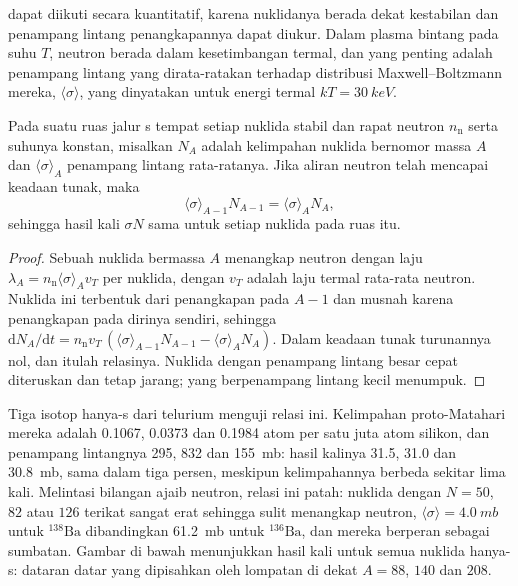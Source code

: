  dapat diikuti secara kuantitatif, karena nuklidanya berada dekat kestabilan dan
penampang lintang penangkapannya dapat diukur. Dalam plasma bintang pada suhu $T$,
neutron berada dalam kesetimbangan termal, dan yang penting adalah
penampang lintang yang dirata-ratakan terhadap distribusi Maxwell--Boltzmann mereka,
$\langle\sigma\rangle$, yang dinyatakan untuk energi termal
$kT = \qty{30}{keV}$.

\begin{proposition}\label{prop:b3:origin-of-elements:sigma-n}
Pada suatu ruas jalur s tempat setiap nuklida stabil dan rapat
neutron $n_\mathrm{n}$ serta suhunya konstan, misalkan $N_A$ adalah kelimpahan
nuklida bernomor massa $A$ dan $\langle\sigma\rangle_A$ penampang lintang rata-ratanya.
Jika aliran neutron telah mencapai
keadaan tunak, maka
\[
\langle\sigma\rangle_{A-1} N_{A-1} = \langle\sigma\rangle_A N_A ,
\]
sehingga hasil kali $\sigma N$ sama untuk setiap nuklida pada
ruas itu.
\end{proposition}

\begin{proof}
Sebuah nuklida bermassa $A$ menangkap neutron dengan laju
$\lambda_A = n_\mathrm{n}\langle\sigma\rangle_A v_T$ per nuklida, dengan $v_T$
adalah laju termal rata-rata neutron. Nuklida ini terbentuk dari penangkapan pada
$A - 1$ dan musnah karena penangkapan pada dirinya sendiri, sehingga
$\mathrm{d}N_A/\mathrm{d}t = n_\mathrm{n} v_T\,(\langle\sigma\rangle_{A-1}
N_{A-1} - \langle\sigma\rangle_A N_A)$. Dalam keadaan tunak turunannya
nol, dan itulah relasinya. Nuklida dengan penampang lintang besar
cepat diteruskan dan tetap jarang; yang berpenampang lintang kecil
menumpuk.
\end{proof}

Tiga isotop hanya-s dari telurium menguji relasi ini. Kelimpahan proto-Matahari mereka
adalah \num{0.1067}, \num{0.0373} dan \num{0.1984} atom per
satu juta atom silikon, dan penampang lintangnya \num{295}, \num{832} dan
\qty{155}{mb}: hasil kalinya \num{31.5}, \num{31.0} dan
\qty{30.8}{mb}, sama dalam tiga persen, meskipun kelimpahannya
berbeda sekitar lima kali. Melintasi bilangan ajaib neutron, relasi ini
patah: nuklida dengan $N = 50$, $82$ atau $126$ terikat sangat erat
sehingga sulit menangkap neutron, $\langle\sigma\rangle = \qty{4.0}{mb}$ untuk
$^{138}\mathrm{Ba}$ dibandingkan \qty{61.2}{mb} untuk $^{136}\mathrm{Ba}$, dan
mereka berperan sebagai sumbatan. Gambar di bawah menunjukkan hasil kali untuk
semua nuklida hanya-s: dataran datar yang dipisahkan oleh lompatan di dekat
$A = 88$, $140$ dan $208$.

